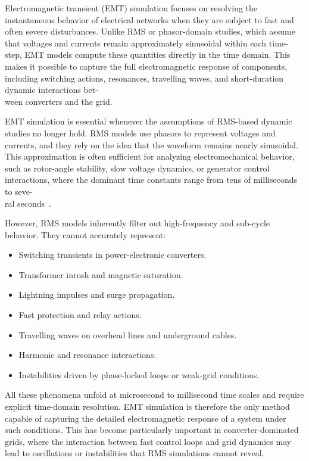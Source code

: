 
Electromagnetic transient (EMT) simulation focuses on resolving the instantaneous 
behavior of electrical networks when they are subject to fast and often severe disturbances.
 Unlike RMS or phasor-domain studies, which assume that voltages and currents remain 
 approximately sinusoidal within each time-step, EMT models compute these quantities directly 
 in the time domain. This makes it possible to capture the full electromagnetic response of components, 
 including switching actions, resonances, travelling waves, and short-duration dynamic interactions 
 bet-\\ween converters and the grid.



 


EMT simulation is essential whenever the assumptions of RMS-based dynamic studies no longer hold. 
RMS models use phasors to represent voltages and currents, and they rely on the idea that the waveform remains nearly sinusoidal. 
This approximation is often sufficient for analyzing electromechanical behavior, such as rotor-angle stability, 
slow voltage dynamics, or generator control interactions, where the dominant time constants range from tens of milliseconds 
to seve-\\ral seconds~\cite{StabilityAndControlKundur}.

However, RMS models inherently filter out high-frequency and sub-cycle behavior. They cannot accurately represent:
\begin{itemize}
    \item Switching transients in power-electronic converters.
    \item Transformer inrush and magnetic saturation.
    \item Lightning impulses and surge propagation.
    \item Fast protection and relay actions.
    \item Travelling waves on overhead lines and underground cables.
    \item Harmonic and resonance interactions.
    \item Instabilities driven by phase-locked loops or weak-grid conditions.
\end{itemize}

All these phenomena unfold at microsecond to millisecond time scales and require explicit time-domain resolution. 
EMT simulation is therefore the only method capable of capturing the detailed electromagnetic response of a system 
under such conditions. This has become particularly important in converter-dominated grids, where the interaction between 
fast control loops and grid dynamics may lead to oscillations or instabilities that RMS simulations cannot reveal.

